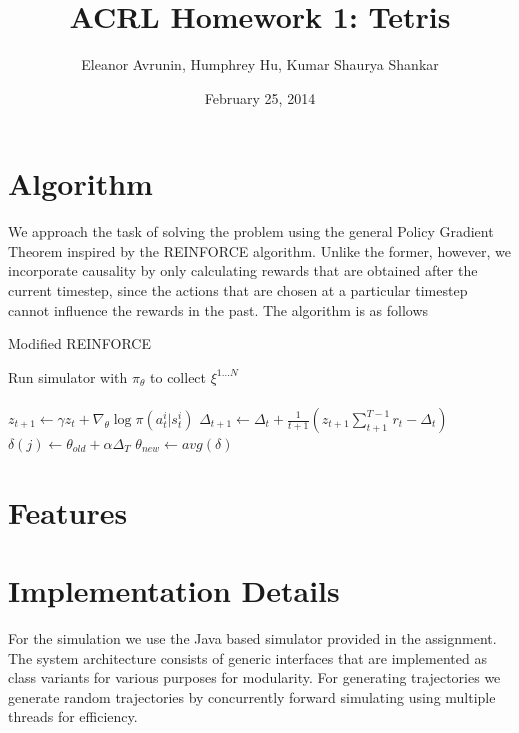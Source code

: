 \documentclass[11pt]{article}
\begin{document}
  

\title{ACRL Homework 1:  Tetris}
\date{February 25, 2014}
\author{Eleanor Avrunin, Humphrey Hu, Kumar Shaurya Shankar}

\maketitle

\section{Algorithm}
We approach the task of solving the problem using the general Policy Gradient Theorem inspired by the REINFORCE algorithm. Unlike the former, however, we incorporate causality by only calculating rewards that are obtained after the current timestep, since the actions that are chosen at a particular timestep cannot influence the rewards in the past. The algorithm is as follows

\begin{algorithm}
\caption{Modified REINFORCE}
\label{reinforce_alg}
\begin{algorithmic}
\STATE Run simulator with $\pi_{\theta}$ to collect $\xi^{1...N}$\\
\\
\STATE $z_{t+1} \gets \gamma z_t + \nabla_{\theta}\log\pi\left(a_{t}^{i}|s_{t}^{i} \right)$
\STATE $\Delta_{t+1} \gets \Delta_t + \frac{1}{t+1} \left( z_{t+1}\sum\limits_{t+1}^{T-1} r_t - \Delta_t\right)$
\ENDFOR
\STATE $\delta(j) \gets \theta_{old}+\alpha \Delta_T$
\ENDFOR
\STATE $\theta_{new} \gets  avg(\delta)$
\ENDFOR
\end{algorithmic}
\end{algorithm}


\section{Features}


\section{Implementation Details}
For the simulation we use the Java based simulator provided in the assignment. The system architecture consists of generic interfaces that are implemented as class variants for various purposes for modularity. For generating trajectories we generate random trajectories by concurrently forward simulating using multiple threads for efficiency.
\end{document}
